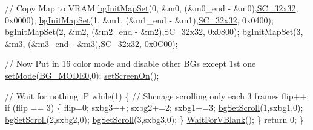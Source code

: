 \begin{DoxyCodeInclude}
    \textcolor{comment}{// Copy Map to VRAM}
    \hyperlink{a00317_acc385296e159449a81d18f5e219c8032}{bgInitMapSet}(0, &m0, (&m0\_end - &m0),\hyperlink{a00317_a11724b6748ce0954e9b43819263537fc}{SC\_32x32}, 0x0000);
    \hyperlink{a00317_acc385296e159449a81d18f5e219c8032}{bgInitMapSet}(1, &m1, (&m1\_end - &m1),\hyperlink{a00317_a11724b6748ce0954e9b43819263537fc}{SC\_32x32}, 0x0400);
    \hyperlink{a00317_acc385296e159449a81d18f5e219c8032}{bgInitMapSet}(2, &m2, (&m2\_end - &m2),\hyperlink{a00317_a11724b6748ce0954e9b43819263537fc}{SC\_32x32}, 0x0800);
    \hyperlink{a00317_acc385296e159449a81d18f5e219c8032}{bgInitMapSet}(3, &m3, (&m3\_end - &m3),\hyperlink{a00317_a11724b6748ce0954e9b43819263537fc}{SC\_32x32}, 0x0C00);

    \textcolor{comment}{// Now Put in 16 color mode and disable other BGs except 1st one}
    \hyperlink{a00353_afd9e46ae627d055dd8c98a4b0ebb73b1}{setMode}(\hyperlink{a00317_a82bccfa80c8aa4ff5aa4e1416e0ade25}{BG\_MODE0},0);  
    \hyperlink{a00353_abc7d4ef8ebc22f5b710927909bb3f144}{setScreenOn}();
    
    \textcolor{comment}{// Wait for nothing :P}
    \textcolor{keywordflow}{while}(1) \{
        \textcolor{comment}{// Shcnage scrolling only each 3 frames}
        flip++;
        \textcolor{keywordflow}{if} (flip == 3) \{
            flip=0;
            sxbg3++;
            sxbg2+=2;
            sxbg1+=3;
            \hyperlink{a00317_aa5e0112ea2d4b514c2dddc6ed2c7c3c7}{bgSetScroll}(1,sxbg1,0);
            \hyperlink{a00317_aa5e0112ea2d4b514c2dddc6ed2c7c3c7}{bgSetScroll}(2,sxbg2,0);
            \hyperlink{a00317_aa5e0112ea2d4b514c2dddc6ed2c7c3c7}{bgSetScroll}(3,sxbg3,0);
        \}
        \hyperlink{a00326_a815e2626bd26d0e936d507a363ecd723}{WaitForVBlank}();
    \}
    \textcolor{keywordflow}{return} 0;
\}
\end{DoxyCodeInclude}
 